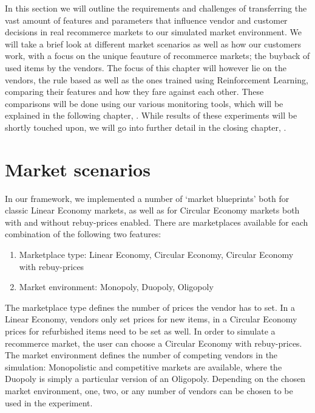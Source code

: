 \begin{jointwork}
	In this section we will outline the requirements and challenges of transferring the vast amount of features and parameters that influence vendor and customer decisions in real recommerce markets to our simulated market environment. We will take a brief look at different market scenarios as well as how our customers work, with a focus on the unique feauture of recommerce markets; the buyback of used items by the vendors. The focus of this chapter will however lie on the vendors, the rule based as well as the ones trained using Reinforcement Learning, comparing their features and how they fare against each other. These comparisons will be done using our various monitoring tools, which will be explained in the following chapter, . While results of these experiments will be shortly touched upon, we will go into further detail in the closing chapter, .
\end{jointwork}

\section{Market scenarios}\label{sec:MarketScenarios}

In our framework, we implemented a number of `market blueprints' both for classic Linear Economy markets, as well as for Circular Economy markets both with and without rebuy-prices enabled. There are marketplaces available for each combination of the following two features:
\begin{enumerate}
	\item Marketplace type: Linear Economy, Circular Economy, Circular Economy with rebuy-prices
	\item Market environment: Monopoly, Duopoly, Oligopoly
\end{enumerate}
The marketplace type defines the number of prices the vendor has to set. In a Linear Economy, vendors only set prices for new items, in a Circular Economy prices for refurbished items need to be set as well. In order to simulate a recommerce market, the user can choose a Circular Economy with rebuy-prices.
The market environment defines the number of competing vendors in the simulation: Monopolistic and competitive markets are available, where the Duopoly is simply a particular version of an Oligopoly. Depending on the chosen market environment, one, two, or any number of vendors can be chosen to be used in the experiment.

